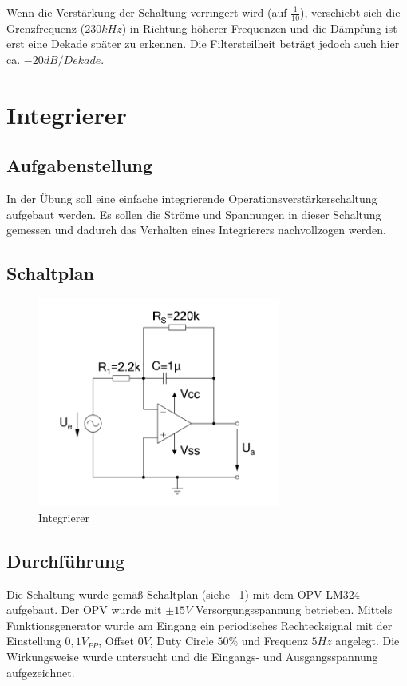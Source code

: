 \documentclass[12pt,a4paper,titlepage]{article}
\begin{document}
\noindent Wenn die Verstärkung der Schaltung verringert wird (auf $\frac{1}{10}$), verschiebt sich die Grenzfrequenz ($230kHz$) in Richtung höherer Frequenzen und die Dämpfung ist erst eine Dekade später zu erkennen. Die Filtersteilheit beträgt jedoch auch hier ca. $-20dB/Dekade$.

\section{Integrierer}


\subsection*{Aufgabenstellung}
In der \"Ubung soll eine einfache integrierende Operationsverstärkerschaltung aufgebaut werden. Es sollen die Str\"ome und Spannungen in dieser Schaltung gemessen und dadurch das Verhalten eines Integrierers nachvollzogen werden.

\subsection*{Schaltplan}
\begin{figure}[H]
  \centering
  \includegraphics[width=80mm]{integrierer_opv_schaltung.png}
  \caption{Integrierer}
  \label{figure31}
\end{figure}

\subsection*{Durchf\"uhrung}
Die Schaltung wurde gemäß Schaltplan (siehe ~\ref{figure31}) mit dem OPV LM324 aufgebaut. Der OPV wurde mit $\pm 15V$ Versorgungsspannung betrieben. Mittels Funktionsgenerator wurde am Eingang ein periodisches Rechtecksignal mit der Einstellung $0,1 V_{PP}$, Offset $0V$, Duty Circle $50\%$ und Frequenz $5Hz$ angelegt. Die Wirkungsweise wurde untersucht und die Eingangs- und Ausgangsspannung aufgezeichnet.
\end{document}
